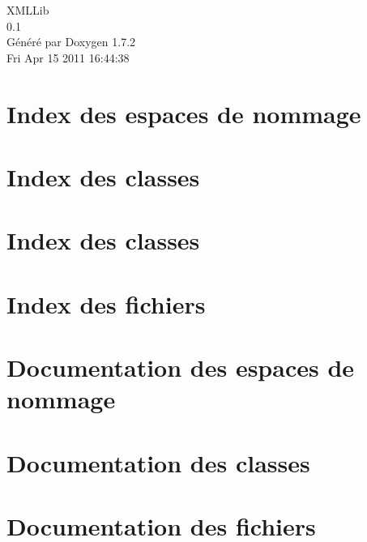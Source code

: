 \documentclass[a4paper]{book}
\begin{document}
\hypersetup{pageanchor=false}
\begin{titlepage}
\vspace*{7cm}
\begin{center}
{\Large XMLLib \\[1ex]\large 0.1 }\\
\vspace*{1cm}
{\large Généré par Doxygen 1.7.2}\\
\vspace*{0.5cm}
{\small Fri Apr 15 2011 16:44:38}\\
\end{center}
\end{titlepage}
\clearemptydoublepage
{}
\tableofcontents
\clearemptydoublepage
{}
\hypersetup{pageanchor=true}
\chapter{Index des espaces de nommage}

\chapter{Index des classes}

\chapter{Index des classes}

\chapter{Index des fichiers}

\chapter{Documentation des espaces de nommage}

\chapter{Documentation des classes}







\chapter{Documentation des fichiers}













\printindex
\end{document}
